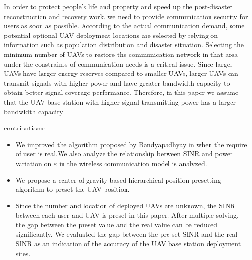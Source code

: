 \documentclass[journal]{IEEEtran}
\begin{document}
In order to protect people's life and property and speed up the post-disaster reconstruction and recovery work, we need to provide communication security for users as soon as possible. According to the actual communication demand, some potential optional UAV deployment locations are selected by relying on information such as population distribution and disaster situation. Selecting the minimum number of UAVs to restore the communication network in that area under the constraints of communication needs is a critical issue. Since larger UAVs have larger energy reserves compared to smaller UAVs, larger UAVs can transmit signals with higher power and have greater bandwidth capacity to obtain better signal coverage performance. Therefore, in this paper we assume that the UAV base station with higher signal transmitting power has a larger bandwidth capacity.



contributions:
\begin{itemize}
	
	\item We improved the algorithm proposed by Bandyapadhyay in \cite{bandyapadhyay_capacitated_2020} when the require of user is real.We also analyze the relationship between SINR and power variation on $\varepsilon$ in the wireless communication model is analyzed.
	
	\item We propose a center-of-gravity-based  hierarchical position presetting algorithm to preset the UAV position.
	
	\item Since the number and location of deployed UAVs are unknown, the SINR between each user and UAV is preset in this paper. After multiple solving, the gap between the preset value and the real value can be reduced significantly. We evaluated the gap between the pre-set SINR and the real SINR as an indication of the accuracy of the UAV base station deployment sites.
\end{itemize}
\end{document}
